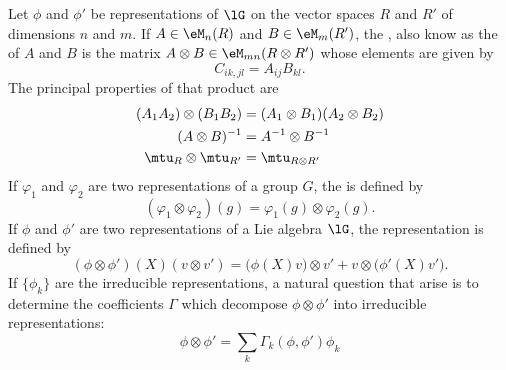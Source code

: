 Let $\phi$ and $\phi'$ be representations of $\lG$ on the vector spaces $R$ and $R'$ of dimensions $n$ and $m$. If $A\in\eM_n(R)$ and $B\in\eM_m(R')$, the , also know as the  of $A$ and $B$ is the matrix $A\otimes B\in\eM_{mn}(R\otimes R')$ whose elements are given by
\begin{equation}
	C_{ik,jl}=A_{ij}B_{kl}.
\end{equation}
The principal properties of that product are
\begin{subequations}
	\begin{align}
		(A_1A_2)\otimes(B_1B_2)  & =(A_1\otimes B_1)(A_2\otimes B_2) \\
		(A\otimes B)^{-1}        & = A^{-1}\otimes B^{-1}            \\
		\mtu_{R}\otimes\mtu_{R'} & =\mtu_{R\otimes R'}
	\end{align}
\end{subequations}
If $\varphi_1$ and $\varphi_2$ are two representations of a group $G$, the  is defined by
\begin{equation}
	(\varphi_1\otimes\varphi_2)(g)=\varphi_1(g)\otimes\varphi_2(g).
\end{equation}
If $\phi$ and $\phi'$ are two representations of a Lie algebra $\lG$, the  representation is defined by
\begin{equation}
	(\phi\otimes\phi')(X)(v\otimes v')=\big( \phi(X)v\big)\otimes v'+v\otimes\big( \phi'(X)v' \big).
\end{equation}
If $\{ \phi_k \}$ are the irreducible representations, a natural question that arise is to determine the coefficients $\Gamma$ which decompose $\phi\otimes\phi'$ into irreducible representations:
\begin{equation}
	\phi\otimes\phi'=\sum_k\Gamma_k(\phi,\phi')\phi_k
\end{equation}

